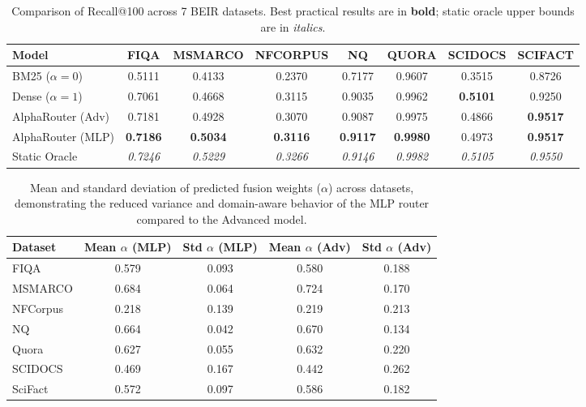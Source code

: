 
\begin{table}[t]
\centering
\caption{Comparison of Recall@100 across 7 BEIR datasets. Best practical results are in \textbf{bold}; static oracle upper bounds are in \textit{italics}.}
\label{tab:recall_100}
\begin{tabular}{lccccccc}
\toprule
Model & FIQA & MSMARCO & NFCORPUS & NQ & QUORA & SCIDOCS & SCIFACT \\
\midrule
BM25 ($\alpha=0$) & 0.5111 & 0.4133 & 0.2370 & 0.7177 & 0.9607 & 0.3515 & 0.8726 \\
Dense ($\alpha=1$) & 0.7061 & 0.4668 & 0.3115 & 0.9035 & 0.9962 & \textbf{0.5101} & 0.9250 \\
\midrule
AlphaRouter (Adv) & 0.7181 & 0.4928 & 0.3070 & 0.9087 & 0.9975 & 0.4866 & \textbf{0.9517} \\
AlphaRouter (MLP) & \textbf{0.7186} & \textbf{0.5034} & \textbf{0.3116} & \textbf{0.9117} & \textbf{0.9980} & 0.4973 & \textbf{0.9517} \\
\midrule
Static Oracle & \textit{0.7246} & \textit{0.5229} & \textit{0.3266} & \textit{0.9146} & \textit{0.9982} & \textit{0.5105} & \textit{0.9550} \\
\bottomrule
\end{tabular}
\end{table}


\begin{table}[h]
\centering
\caption{Mean and standard deviation of predicted fusion weights ($\alpha$) across datasets, demonstrating the reduced variance and domain-aware behavior of the MLP router compared to the Advanced model.}
\label{tab:alpha_stats}
\begin{tabular}{lcccc}
\toprule
\textbf{Dataset} & \textbf{Mean $\alpha$ (MLP)} & \textbf{Std $\alpha$ (MLP)} & \textbf{Mean $\alpha$ (Adv)} & \textbf{Std $\alpha$ (Adv)} \\
\midrule
FIQA & 0.579 & 0.093 & 0.580 & 0.188 \\
MSMARCO & 0.684 & 0.064 & 0.724 & 0.170 \\
NFCorpus & 0.218 & 0.139 & 0.219 & 0.213 \\
NQ & 0.664 & 0.042 & 0.670 & 0.134 \\
Quora & 0.627 & 0.055 & 0.632 & 0.220 \\
SCIDOCS & 0.469 & 0.167 & 0.442 & 0.262 \\
SciFact & 0.572 & 0.097 & 0.586 & 0.182 \\
\bottomrule
\end{tabular}
\end{table}

